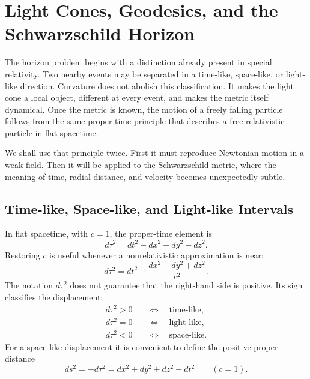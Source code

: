 \chapter{Light Cones, Geodesics, and the Schwarzschild Horizon}

The horizon problem begins with a distinction already present in special
relativity.  Two nearby events may be separated in a time-like, space-like, or
light-like direction.  Curvature does not abolish this classification.  It
makes the light cone a local object, different at every event, and makes the
metric itself dynamical.  Once the metric is known, the motion of a freely
falling particle follows from the same proper-time principle that describes a
free relativistic particle in flat spacetime.

We shall use that principle twice.  First it must reproduce Newtonian motion in
a weak field.  Then it will be applied to the Schwarzschild metric, where the
meaning of time, radial distance, and velocity becomes unexpectedly subtle.

\section{Time-like, Space-like, and Light-like Intervals}

In flat spacetime, with \(c=1\), the proper-time element is
\begin{equation}
d\tau^2=dt^2-dx^2-dy^2-dz^2.
\label{eq:l5-minkowski-proper-time}
\end{equation}
Restoring \(c\) is useful whenever a nonrelativistic approximation is near:
\begin{equation}
d\tau^2
=dt^2-\frac{dx^2+dy^2+dz^2}{c^2}.
\label{eq:l5-minkowski-c}
\end{equation}
The notation \(d\tau^2\) does not guarantee that the right-hand side is
positive.  Its sign classifies the displacement:
\begin{align}
d\tau^2>0
&\quad\Longleftrightarrow\quad \text{time-like},\\
d\tau^2=0
&\quad\Longleftrightarrow\quad \text{light-like},\\
d\tau^2<0
&\quad\Longleftrightarrow\quad \text{space-like}.
\end{align}
For a space-like displacement it is convenient to define the positive proper
distance
\begin{equation}
ds^2=-d\tau^2
=dx^2+dy^2+dz^2-dt^2
\qquad(c=1).
\label{eq:l5-proper-distance}
\end{equation}

